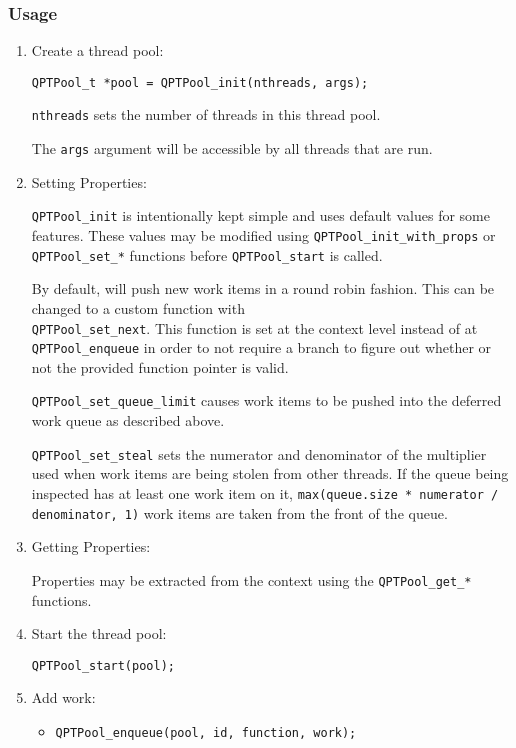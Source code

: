 \subsubsection{Usage}
\begin{enumerate}
\item Create a thread pool:

  \texttt{QPTPool\_t *pool = QPTPool\_init(nthreads, args);}

  \texttt{nthreads} sets the number of threads in this thread
  pool.

  The \texttt{args} argument will be accessible by all threads that
  are run.

\item Setting Properties:

  \texttt{QPTPool\_init} is intentionally kept simple and uses default
  values for some features. These values may be modified using
  \texttt{QPTPool\_init\_with\_props} or \texttt{QPTPool\_set\_*}
  functions before \texttt{QPTPool\_start} is called.

  By default, \qptp will push new work items in a round robin
  fashion. This can be changed to a custom function with
  \\\texttt{QPTPool\_set\_next}. This function is set at the context
  level instead of at \texttt{QPTPool\_enqueue} in order to not
  require a branch to figure out whether or not the provided function
  pointer is valid.

  \texttt{QPTPool\_set\_queue\_limit} causes work items to be pushed
  into the deferred work queue as described above.

  \texttt{QPTPool\_set\_steal} sets the numerator and denominator of
  the multiplier used when work items are being stolen from other
  threads. If the queue being inspected has at least one work item on
  it, \texttt{max(queue.size * numerator / denominator, 1)} work items
  are taken from the front of the queue.

\item Getting Properties:

  Properties may be extracted from the context using the
  \texttt{QPTPool\_get\_*} functions.

\item Start the thread pool:

  \texttt{QPTPool\_start(pool);}

\item Add work:

  \begin{itemize}
    \item \texttt{QPTPool\_enqueue(pool, id, function, work);}


\end{itemize}
\end{enumerate}
